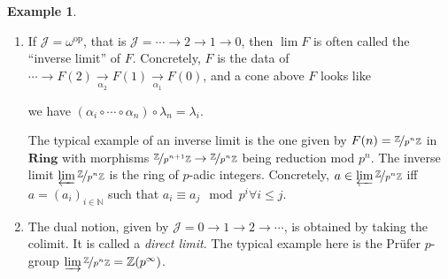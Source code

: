 \documentclass{article}
\newcommand{\op}{\mathrm{op}}
\newcommand{\N}{\mathbb{N}}
\newcommand{\Z}{\mathbb{Z}}
\newcommand{\Jcat}{\mathcal{J}}
\newcommand{\Ring}{\mathbf{Ring}}
\newcommand{\invlim}{\varprojlim}
\newcommand{\dirlim}{\varinjlim}
\theoremstyle{plain}
\theoremstyle{definition}
\newtheorem{example}[theorem]{Example}
\theoremstyle{remark}
\begin{document}
\begin{example}
\begin{enumerate}
\begin{center}
    \end{center}
    \item If $\Jcat = \omega^\op$, that is $\Jcat = \cdots \to 2 \to 1 \to 0$, then $\lim F$ is often called the ``inverse limit'' of $F$. Concretely, $F$ is the data of $\cdots \to F(2) \xrightarrow[\alpha_2]{} F(1) \xrightarrow[\alpha_1]{} F(0)$, and a cone above $F$ looks like
    \begin{center}
        \hspace{2em}
        we have $(\alpha_i \circ \cdots \circ \alpha_n) \circ \lambda_n = \lambda_i$.
    \end{center}
    The typical example of an inverse limit is the one given by $F(n) = \nicefrac{\Z}{p^n\Z}$ in $\Ring$ with morphisms $\nicefrac{\Z}{p^{n+1}\Z} \to \nicefrac{\Z}{p^n\Z}$ being reduction mod $p^n$. The inverse limit $\invlim \nicefrac{\Z}{p^n\Z}$ is the ring of $p$-adic integers. Concretely, $a \in \invlim \nicefrac{\Z}{p^n\Z}$ iff $a = (a_i)_{i\in \N}$ such that $a_i \equiv a_j \mod p^i \forall i \le j$.
    \item The dual notion, given by $\Jcat = 0 \to 1 \to 2 \to \cdots$, is obtained by taking the colimit. It is called a \emph{direct limit}. The typical example here is the Prüfer $p$-group $\dirlim \nicefrac{\Z}{p^n \Z} = \Z(p^\infty)$.
    \end{enumerate}
\end{example}
\end{document}
